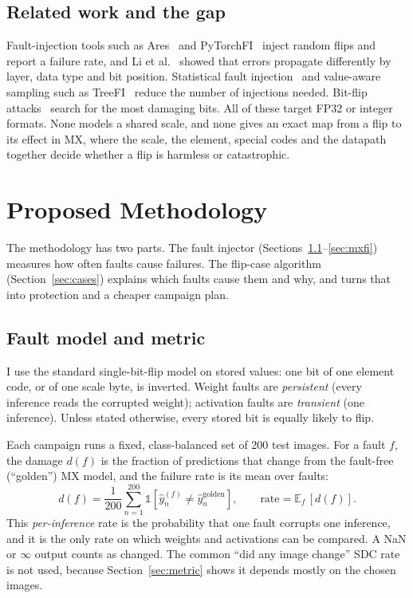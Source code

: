 \documentclass[12pt,a4paper]{article}
\begin{document}
\subsection{Related work and the gap}

Fault-injection tools such as Ares~\cite{reagen2018ares} and PyTorchFI~\cite{mahmoud2020pytorchfi}
inject random flips and report a failure rate, and Li et al.~\cite{li2017understanding} showed
that errors propagate differently by layer, data type and bit position. Statistical fault
injection~\cite{leveugle2009sfi} and value-aware sampling such as TreeFI~\cite{treefi2026}
reduce the number of injections needed. Bit-flip attacks~\cite{rakin2019bfa,hong2019terminal}
search for the most damaging bits. All of these target FP32 or integer formats. None models a
shared scale, and none gives an exact map from a flip to its effect in MX, where the scale, the
element, special codes and the datapath together decide whether a flip is harmless or
catastrophic.

\section{Proposed Methodology}

The methodology has two parts. The fault injector (Sections~\ref{sec:faultmodel}--\ref{sec:mxfi})
measures how often faults cause failures. The flip-case algorithm (Section~\ref{sec:cases})
explains which faults cause them and why, and turns that into protection and a cheaper
campaign plan.

\subsection{Fault model and metric}
\label{sec:faultmodel}

I use the standard single-bit-flip model on stored values: one bit of one element code, or of
one scale byte, is inverted. Weight faults are \emph{persistent} (every inference reads the
corrupted weight); activation faults are \emph{transient} (one inference). Unless stated
otherwise, every stored bit is equally likely to flip.

Each campaign runs a fixed, class-balanced set of 200 test images. For a fault $f$, the damage
$d(f)$ is the fraction of predictions that change from the fault-free (``golden'') MX model,
and the failure rate is its mean over faults:
\begin{equation}
    d(f) = \frac{1}{200}\sum_{n=1}^{200} \mathbb{1}\!\left[\hat y_n^{(f)} \neq \hat y_n^{\text{golden}}\right],
    \qquad
    \text{rate} = \mathbb{E}_f\,[d(f)] .
\end{equation}
This \emph{per-inference} rate is the probability that one fault corrupts one inference, and it
is the only rate on which weights and activations can be compared. A NaN or $\infty$ output
counts as changed. The common ``did any image change'' SDC rate is not used, because
Section~\ref{sec:metric} shows it depends mostly on the chosen images.
\end{document}
